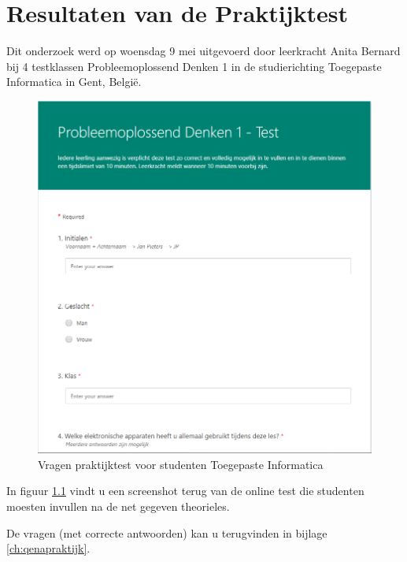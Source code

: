
\chapter{Resultaten van de Praktijktest}
\label{ch:resultaten_praktijk}

Dit onderzoek werd op woensdag 9 mei uitgevoerd door leerkracht Anita Bernard bij 4 testklassen Probleemoplossend Denken 1 in de studierichting Toegepaste Informatica in Gent, België.

\begin{figure}
	\includegraphics[width=\textwidth]
	{img/vragen-praktijktest.png}
	\caption{Vragen praktijktest voor studenten Toegepaste Informatica }
	\label{fig:vragen-praktijk}
\end{figure}

In figuur \ref{fig:vragen-praktijk} vindt u een screenshot terug van de online test die studenten moesten invullen na de net gegeven theorieles. 

De vragen (met correcte antwoorden) kan u terugvinden in bijlage \ref{ch:qenapraktijk}.

